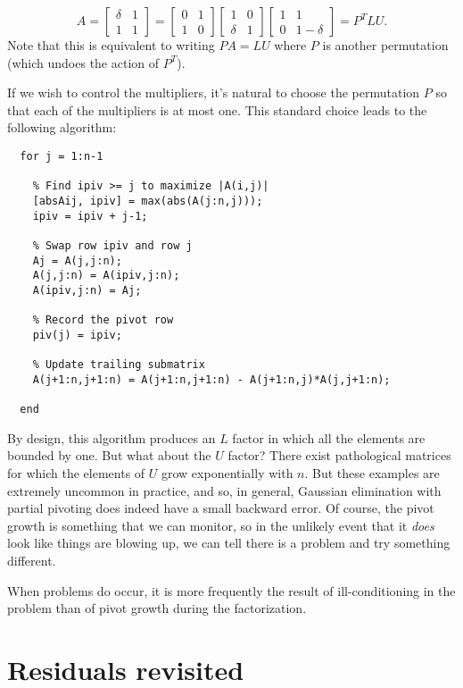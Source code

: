\documentclass[12pt, leqno]{article}
\begin{document}
\[
  A = \begin{bmatrix} \delta & 1 \\ 1 & 1 \end{bmatrix} =
      \begin{bmatrix} 0 & 1 \\ 1 & 0 \end{bmatrix}
      \begin{bmatrix} 1 & 0 \\ \delta & 1 \end{bmatrix}
      \begin{bmatrix} 1 & 1 \\ 0 & 1-\delta \end{bmatrix}
    = P^T LU.
\]
Note that this is equivalent to writing $P A = LU$ where $P$
is another permutation (which undoes the action of $P^T$).  

If we wish to control the multipliers, it's natural to choose
the permutation $P$ so that each of the multipliers is at most one.
This standard choice leads to the following algorithm:
\begin{verbatim}
  for j = 1:n-1

    % Find ipiv >= j to maximize |A(i,j)|
    [absAij, ipiv] = max(abs(A(j:n,j)));
    ipiv = ipiv + j-1;

    % Swap row ipiv and row j
    Aj = A(j,j:n);
    A(j,j:n) = A(ipiv,j:n);
    A(ipiv,j:n) = Aj;

    % Record the pivot row
    piv(j) = ipiv;

    % Update trailing submatrix
    A(j+1:n,j+1:n) = A(j+1:n,j+1:n) - A(j+1:n,j)*A(j,j+1:n);

  end
\end{verbatim}

By design, this algorithm produces an $L$ factor in which all the
elements are bounded by one.  But what about the $U$ factor?  There
exist pathological matrices for which the elements of $U$ grow
exponentially with $n$.  But these examples are extremely uncommon in
practice, and so, in general, Gaussian elimination with partial
pivoting does indeed have a small backward error.  Of course, the
pivot growth is something that we can monitor, so in the unlikely event
that it {\em does} look like things are blowing up, we can tell there
is a problem and try something different.

When problems do occur, it is more frequently the result of
ill-conditioning in the problem than of pivot growth during the
factorization.

\section*{Residuals revisited}
\end{document}
